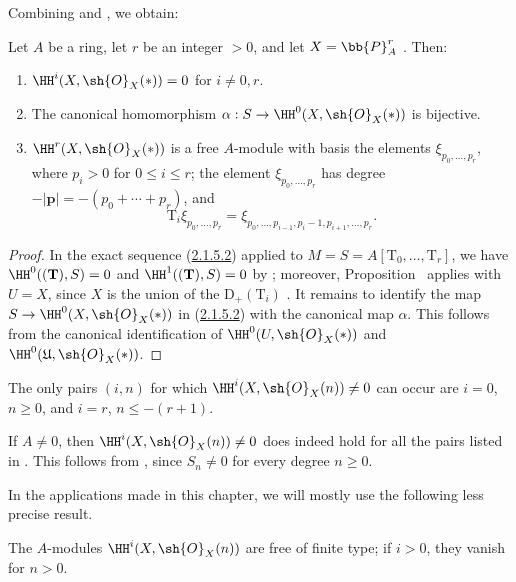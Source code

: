 Combining  and , we obtain:

\begin{proposition}[2.1.12]
\label{III.2.1.12}
Let $A$ be a ring, let $r$ be an integer $>0$, and let $X=\bb{P}_A^r$ .
Then:
\begin{enumerate}
  \item[{\rm(i)}] $\HH^i(X,\sh{O}_X(*))=0$ for $i\neq0,r$.
  \item[{\rm(ii)}] The canonical homomorphism $\alpha:S\to\HH^0(X,\sh{O}_X(*))$  is bijective.
  \item[{\rm(iii)}] $\HH^r(X,\sh{O}_X(*))$ is a free $A$-module with basis the elements $\xi_{p_0,\dots,p_r}$, where $p_i>0$ for $0\leq i\leq r$; the element $\xi_{p_0,\dots,p_r}$ has degree $-|\mathbf{p}|=-(p_0+\cdots+p_r)$, and
  \[
    \mathrm{T}_i\xi_{p_0,\dots,p_r}
    =\xi_{p_0,\dots,p_{i-1},p_i-1,p_{i+1},\dots,p_r}.
  \]
\end{enumerate}
\end{proposition}

\begin{proof}
In the exact sequence (\hyperref[III.2.1.5.2]{2.1.5.2}) applied to $M=S=A[\mathrm{T}_0,\dots,\mathrm{T}_r]$, we have $\HH^0((\mathbf{T}),S)=0$ and $\HH^1((\mathbf{T}),S)=0$ by ; moreover, Proposition~ applies with $U=X$, since $X$ is the union of the $\mathrm{D}_+(\mathrm{T}_i)$ .
It remains to identify the map $S\to\HH^0(X,\sh{O}_X(*))$ in (\hyperref[III.2.1.5.2]{2.1.5.2}) with the canonical map $\alpha$.
This follows from the canonical identification of $\HH^0(U,\sh{O}_X(*))$ and $\HH^0(\mathfrak{U},\sh{O}_X(*))$.
\end{proof}

\begin{corollary}[2.1.13]
\label{III.2.1.13}
The only pairs $(i,n)$ for which $\HH^i(X,\sh{O}_X(n))\neq0$ can occur are $i=0$, $n\geq0$, and $i=r$, $n\leq-(r+1)$.
\end{corollary}

If $A\neq0$, then $\HH^i(X,\sh{O}_X(n))\neq0$ does indeed hold for all the pairs listed in .
This follows from , since $S_n\neq0$ for every degree $n\geq0$.

In the applications made in this chapter, we will mostly use the following less precise result.

\begin{corollary}[2.1.14]
\label{III.2.1.14}
The $A$-modules $\HH^i(X,\sh{O}_X(n))$ are free of finite type; if $i>0$, they vanish for $n>0$.
\end{corollary}

